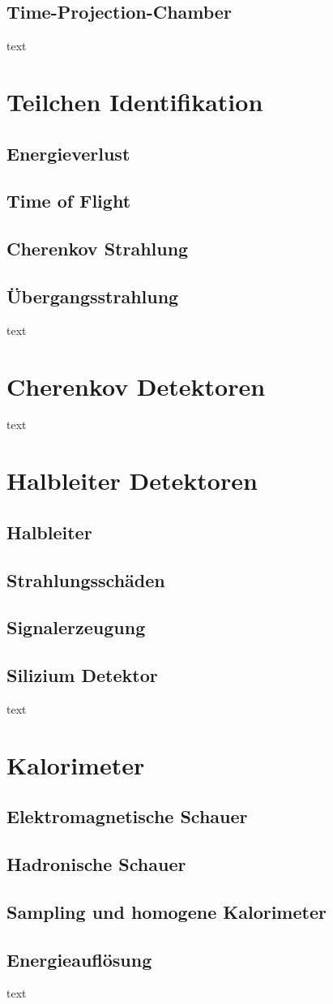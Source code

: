 \subsection{Time-Projection-Chamber}
text
\section{Teilchen Identifikation}
\subsection{Energieverlust}
\subsection{Time of Flight}
\subsection{Cherenkov Strahlung}
\subsection{Übergangsstrahlung}
text
\section{Cherenkov Detektoren}
text
\section{Halbleiter Detektoren}
\subsection{Halbleiter}
\subsection{Strahlungsschäden}
\subsection{Signalerzeugung}
\subsection{Silizium Detektor}
text
\section{Kalorimeter}
\subsection{Elektromagnetische Schauer}
\subsection{Hadronische Schauer}
\subsection{Sampling und homogene Kalorimeter}
\subsection{Energieauflösung}
text
